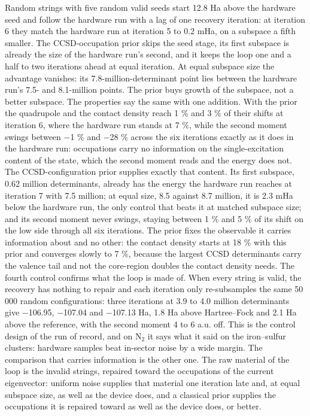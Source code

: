 \documentclass[11pt]{article}
\begin{document}
Random strings with five random valid seeds start 12.8 Ha above the hardware seed and follow the hardware run with a lag of one recovery iteration: at iteration 6 they match the hardware run at iteration 5 to 0.2 mHa, on a subspace a fifth smaller. The CCSD-occupation prior skips the seed stage, its first subspace is already the size of the hardware run's second, and it keeps the loop one and a half to two iterations ahead at equal iteration. At equal subspace size the advantage vanishes: its 7.8-million-determinant point lies between the hardware run's 7.5- and 8.1-million points. The prior buys growth of the subspace, not a better subspace. The properties say the same with one addition. With the prior the quadrupole and the contact density reach 1 \% and 3 \% of their shifts at iteration 6, where the hardware run stands at 7 \%, while the second moment swings between $-$1 \% and $-$28 \% across the six iterations exactly as it does in the hardware run: occupations carry no information on the single-excitation content of the state, which the second moment reads and the energy does not. The CCSD-configuration prior supplies exactly that content. Its first subspace, 0.62 million determinants, already has the energy the hardware run reaches at iteration 7 with 7.5 million; at equal size, 8.5 against 8.7 million, it is 2.3 mHa below the hardware run, the only control that beats it at matched subspace size; and its second moment never swings, staying between 1 \% and 5 \% of its shift on the low side through all six iterations. The prior fixes the observable it carries information about and no other: the contact density starts at 18 \% with this prior and converges slowly to 7 \%, because the largest CCSD determinants carry the valence tail and not the core-region doubles the contact density needs. The fourth control confirms what the loop is made of. When every string is valid, the recovery has nothing to repair and each iteration only re-subsamples the same 50 000 random configurations: three iterations at 3.9 to 4.0 million determinants give $-$106.95, $-$107.04 and $-$107.13 Ha, 1.8 Ha above Hartree--Fock and 2.1 Ha above the reference, with the second moment 4 to 6 a.u. off. This is the control design of the run of record, and on N$_2$ it says what it said on the iron--sulfur clusters: hardware samples beat in-sector noise by a wide margin. The comparison that carries information is the other one. The raw material of the loop is the invalid strings, repaired toward the occupations of the current eigenvector: uniform noise supplies that material one iteration late and, at equal subspace size, as well as the device does, and a classical prior supplies the occupations it is repaired toward as well as the device does, or better.
\end{document}
